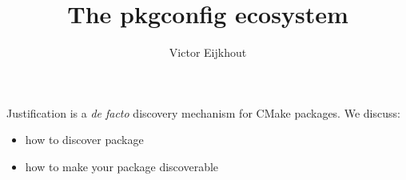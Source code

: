 \documentclass[10pt]{beamer}
\begin{document}

\title[Pkgconfig tutorial]{The pkgconfig ecosystem}
\author[Eijkhout]{Victor Eijkhout}
\date{\hpcsemester}

\maketitle

\begin{frame}{Justification}
   is a \textit{de facto} discovery mechanism
  for CMake packages. We discuss:
  \begin{itemize}
  \item how to discover package
  \item how to make your package discoverable
  \end{itemize}
\end{frame}



\end{document}
